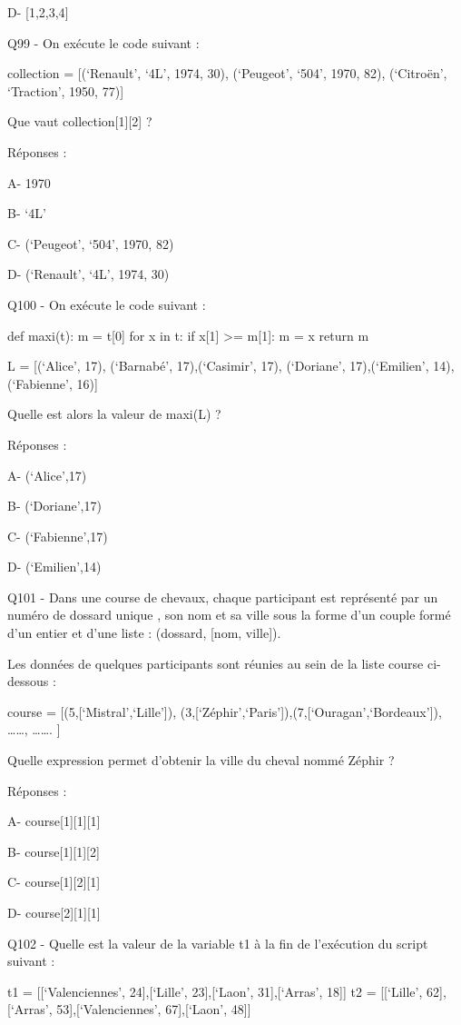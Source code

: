 \documentclass[
]{book}
\begin{document}
D- {[}1,2,3,4{]}

Q99 - On exécute le code suivant :

collection = {[}(`Renault', `4L', 1974, 30),
(`Peugeot', `504', 1970, 82),
(`Citroën', `Traction', 1950, 77){]}

Que vaut collection{[}1{]}{[}2{]} ?

Réponses :

A- 1970

B- `4L'

C- (`Peugeot', `504', 1970, 82)

D- (`Renault', `4L', 1974, 30)

Q100 - On exécute le code suivant :

def maxi(t):
m = t{[}0{]}
for x in t:
if x{[}1{]} \textgreater= m{[}1{]}:
m = x
return m

L = {[}(`Alice', 17), (`Barnabé', 17),(`Casimir', 17), (`Doriane', 17),(`Emilien', 14), (`Fabienne', 16){]}

Quelle est alors la valeur de maxi(L) ?

Réponses :

A- (`Alice',17)

B- (`Doriane',17)

C- (`Fabienne',17)

D- (`Emilien',14)

Q101 - Dans une course de chevaux, chaque participant est représenté par un numéro de dossard unique , son nom et sa ville sous la forme d'un couple formé d'un entier et d'une liste : (dossard, {[}nom, ville{]}).

Les données de quelques participants sont réunies au sein de la liste course ci-dessous :

course = {[}(5,{[}`Mistral',`Lille'{]}), (3,{[}`Zéphir',`Paris'{]}),(7,{[}`Ouragan',`Bordeaux'{]}), \ldots\ldots, \ldots\ldots. {]}

Quelle expression permet d'obtenir la ville du cheval nommé Zéphir ?

Réponses :

A- course{[}1{]}{[}1{]}{[}1{]}

B- course{[}1{]}{[}1{]}{[}2{]}

C- course{[}1{]}{[}2{]}{[}1{]}

D- course{[}2{]}{[}1{]}{[}1{]}

Q102 - Quelle est la valeur de la variable t1 à la fin de l'exécution du script suivant :

t1 = {[}{[}`Valenciennes', 24{]},{[}`Lille', 23{]},{[}`Laon', 31{]},{[}`Arras', 18{]}{]}
t2 = {[}{[}`Lille', 62{]},{[}`Arras', 53{]},{[}`Valenciennes', 67{]},{[}`Laon', 48{]}{]}
\end{document}
